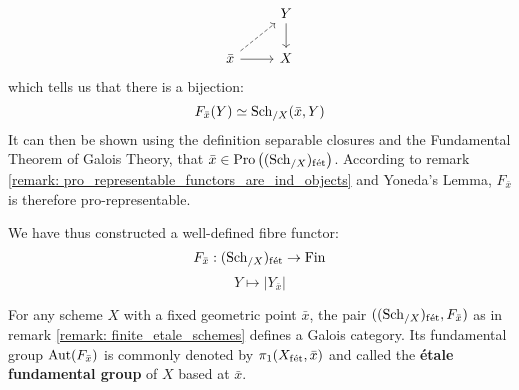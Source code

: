 \begin{remark}
                $$
                    \begin{tikzcd}
                    	& Y \\
                    	{\bar{x}} & X
                    	\arrow[dashed, from=2-1, to=1-2]
                    	\arrow[from=2-1, to=2-2]
                    	\arrow[from=1-2, to=2-2]
                    \end{tikzcd}
                $$
            which tells us that there is a bijection:
                $$F_{\bar{x}}(Y) \simeq \mathrm{Sch}_{/X}(\bar{x}, Y)$$
            It can then be shown using the definition separable closures and the Fundamental Theorem of Galois Theory, that $\bar{x} \in \mathrm{Pro}\left((\mathrm{Sch}_{/X})_{\mathrm{f\acute{e}t}}\right)$. According to remark \ref{remark: pro_representable_functors_are_ind_objects} and Yoneda's Lemma, $F_{\bar{x}}$ is therefore pro-representable.
            
            We have thus constructed a well-defined fibre functor:
                $$F_{\bar{x}}: (\mathrm{Sch}_{/X})_{\mathrm{f\acute{e}t}} \to \mathrm{Fin}$$
                $$Y \mapsto |Y_{\bar{x}}|$$
        \end{remark}
        \begin{definition} \label{def: etale_fundamental_groups}
            For any scheme $X$ with a fixed geometric point $\bar{x}$, the pair $((\mathrm{Sch}_{/X})_{\mathrm{f\acute{e}t}}, F_{\bar{x}})$ as in remark \ref{remark: finite_etale_schemes} defines a Galois category. Its fundamental group $\mathrm{Aut}(F_{\bar{x}})$ is commonly denoted by $\pi_1(X_{\mathrm{f\acute{e}t}}, \bar{x})$ and called the \textbf{\'etale fundamental group} of $X$ based at $\bar{x}$.
        \end{definition}
        
